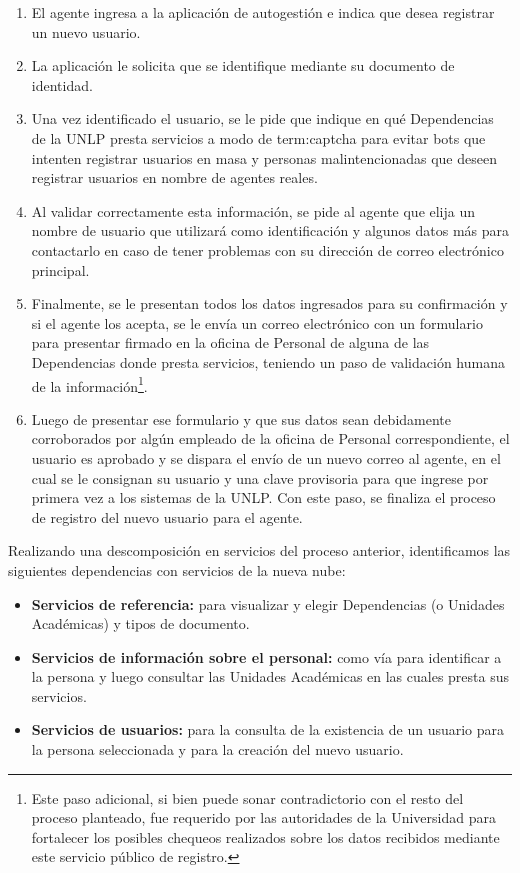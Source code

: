 \begin{enumerate}
  \item El agente ingresa a la aplicación de autogestión e indica que desea registrar un nuevo usuario.
  \item La aplicación le solicita que se identifique mediante su documento de identidad.
  \item Una vez identificado el usuario, se le pide que indique en qué Dependencias de la UNLP presta servicios a modo de \gls{term:captcha} para evitar bots que intenten registrar usuarios en masa y personas malintencionadas que deseen registrar usuarios en nombre de agentes reales.
  \item Al validar correctamente esta información, se pide al agente que elija un nombre de usuario que utilizará como identificación y algunos datos más para contactarlo en caso de tener problemas con su dirección de correo electrónico principal.
  \item Finalmente, se le presentan todos los datos ingresados para su confirmación y si el agente los acepta, se le envía un correo electrónico con un formulario para presentar firmado en la oficina de Personal de alguna de las Dependencias donde presta servicios, teniendo un paso de validación humana de la información\footnote{Este paso adicional, si bien puede sonar contradictorio con el resto del proceso  planteado, fue requerido por las autoridades de la Universidad para fortalecer los posibles chequeos realizados sobre los datos recibidos mediante este servicio público de registro.}.
  \item Luego de presentar ese formulario y que sus datos sean debidamente corroborados por algún empleado de la oficina de Personal correspondiente, el usuario es aprobado y se dispara el envío de un nuevo correo al agente, en el cual se le consignan su usuario y una clave provisoria para que ingrese por primera vez a los sistemas de la UNLP. Con este paso, se finaliza el proceso de registro del nuevo usuario para el agente.
\end{enumerate}

Realizando una descomposición en servicios del proceso anterior, identificamos las siguientes dependencias con servicios de la nueva nube:

\begin{itemize}
  \item \textbf{Servicios de referencia:} para visualizar y elegir Dependencias (o Unidades Académicas) y tipos de documento.
  \item \textbf{Servicios de información sobre el personal:} como vía para identificar a la persona y luego consultar las Unidades Académicas en las cuales presta sus servicios.
  \item \textbf{Servicios de usuarios:} para la consulta de la existencia de un usuario para la persona seleccionada y para la creación del nuevo usuario.
\end{itemize}

